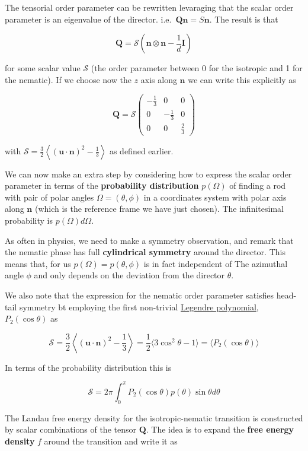 \documentclass[
  letterpaper,
  enabledeprecatedfontcommands]{report}
\begin{document}
The tensorial order parameter can be rewritten levaraging that the
scalar order parameter is an eigenvalue of the director.
i.e.~\(\mathbf{Qn} = S\mathbf{n}\). The result is that

\[
\mathbf{Q}=\mathcal{S}\left(\mathbf{n} \otimes \mathbf{n}-\frac{1}{d} \mathbf{I}\right)
\]

for some scalar value \(\mathcal{S}\) (the order parameter between 0 for
the isotropic and 1 for the nematic). If we choose now the \(z\) axis
along \(\mathbf{n}\) we can write this explicitly as

\[
\mathbf{Q}=\mathcal{S}\left(\begin{array}{ccc}
-\frac{1}{3} & 0 & 0 \\
0 & -\frac{1}{3} & 0 \\
0 & 0 & \frac{2}{3}
\end{array}\right)
\]

with
\(\mathcal{S}=\frac{3}{2}\left\langle(\mathbf{u} \cdot \mathbf{n})^2-\frac{1}{3}\right\rangle\)
as defined earlier.

We can now make an extra step by considering how to express the scalar
order parameter in terms of the \textbf{probability distribution}
\(p(\Omega)\) of finding a rod with pair of polar angles
\(\Omega=(\theta,\phi)\) in a coordinates system with polar axis along
\(\mathbf{n}\) (which is the reference frame we have just chosen). The
infinitesimal probability is \(p(\Omega)d\Omega\).

As often in physics, we need to make a symmetry observation, and remark
that the nematic phase has full \textbf{cylindrical symmetry} around the
director. This means that, for us \(p(\Omega)=p(\theta, \phi)\) is in
fact independent of The azimuthal angle \(\phi\) and only depends on the
deviation from the director \(\theta\).

We also note that the expression for the nematic order parameter
satisfies head-tail symmetry bt employing the first non-trivial
\href{https://mathworld.wolfram.com/LegendrePolynomial.html}{Legendre
polynomial}, \(P_2(\cos\theta)\) as

\[\mathcal{S}=\dfrac{3}{2}\left\langle(\mathbf{u} \cdot \mathbf{n})^2-\frac{1}{3}\right\rangle = \dfrac{1}{2}\langle 3 \cos^2\theta-1\rangle=\langle P_2(\cos\theta)\rangle\]

In terms of the probability distribution this is

\[\mathcal{S}=2\pi \int_0^{\pi}P_2(\cos\theta)p(\theta)\sin\theta d\theta\]

The Landau free energy density for the isotropic-nematic transition is
constructed by scalar combinations of the tensor \(\mathbf{Q}\). The
idea is to expand the \textbf{free energy density} \(f\) around the
transition and write it as
\end{document}
